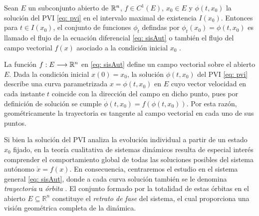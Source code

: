 
\begin{defi}
	Sean $E$ un subconjunto abierto de ${\mathbb{R}}^{n}$, $f \in C^{1}(E)$, $x_{0} \in E$ y $\phi(t, x_{0})$ la solución del PVI \eqref{eq: pvi} en el intervalo maximal de existencia $I(x_{0})$. Entonces para $t\in I(x_{0})$, el conjunto de funciones $\phi_{t}$ defindas por $\phi_{t}(x_{0}) = \phi(t, x_{0})$ es llamado el flujo de la ecuación diferencial \eqref{eq: sisAut} o también el flujo del campo vectorial $f(x)$ \cite[p. 96]{perko2001} asociado a la condición inicial $x_0$ .
\end{defi}

La función $f: E \longrightarrow {\mathbb{R}}^{n}$ en \eqref{eq: sisAut} define un campo vectorial sobre el abierto $E$. Dada la condición inicial $x(0) = x_0$, la solución $\phi(t, x_0)$ del PVI \eqref{eq: pvi} describe una curva parametrizada $x = \phi(t, x_0)$ en $E$ cuyo vector velocidad en cada instante $t$ coincide con la dirección del campo en dicho punto, pues por definición de solución se cumple $\dot{\phi}(t, x_0) = f(\phi(t, x_0))$. Por esta razón, geométricamente la trayectoria es tangente al campo vectorial en cada uno de sus puntos.

Si bien la solución del PVI analiza la evolución individual a partir de un estado $x_0$ fijado, en la teoría cualitativa de sistemas dinámicos resulta de especial interés comprender el comportamiento global de todas las soluciones posibles del sistema autónomo $\dot{x} = f(x)$. En consecuencia, centraremos el estudio en el sistema general \eqref{eq: sisAut}, donde a cada curva solución también se le denomina \textit{trayectoria} u \textit{órbita} \cite[p.~128]{teschl2012}. El conjunto formado por la totalidad de estas órbitas en el abierto $E \subseteq \mathbb{R}^n$ constituye el \textit{retrato de fase} del sistema, el cual proporciona una visión geométrica completa de la dinámica.


